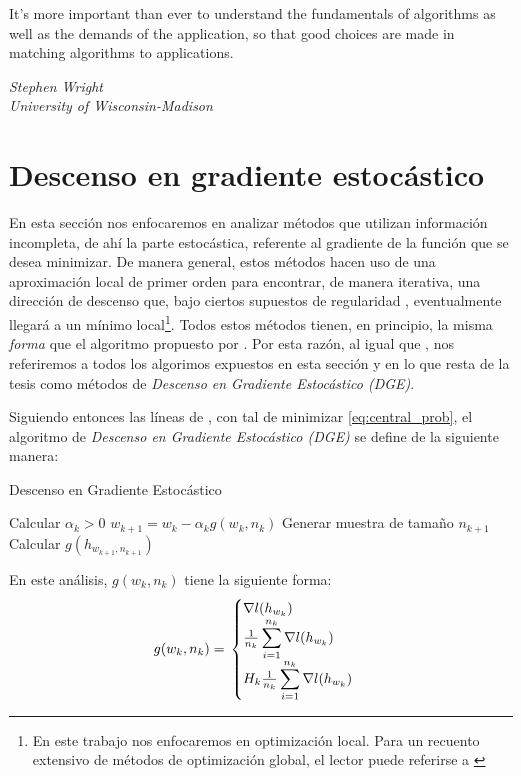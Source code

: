 \documentclass{book}
\theoremstyle{plain}
\theoremstyle{definition}
\theoremstyle{remark}
\begin{document}
\epigraph{It’s more important than ever to understand the fundamentals of
algorithms as well as the demands of the application, so that good
choices are made in matching algorithms to applications.}{\textit{Stephen Wright \\ University of Wisconsin-Madison}}
\newpage

\section{Descenso en gradiente estocástico}

En esta sección nos enfocaremos en analizar métodos que utilizan información incompleta, de ahí la parte estocástica, referente al gradiente de la función que se desea minimizar. De manera general, estos métodos hacen uso de una aproximación local de primer orden para encontrar, de manera iterativa, una dirección de descenso que, bajo ciertos supuestos de regularidad \cite{NOCEDAL}, eventualmente llegará a un mínimo local\footnote{En este trabajo nos enfocaremos en optimización local. Para un recuento extensivo de métodos de optimización global, el lector puede referirse a \cite{TORN}}. Todos estos métodos tienen, en principio, la misma \emph{forma} que el algoritmo propuesto por \cite{ROBBINS}. Por esta razón, al igual que \cite{BOTTOU}, nos referiremos a todos los algorimos expuestos en esta sección y en lo que resta de la tesis como métodos de \emph{Descenso en Gradiente Estocástico (DGE)}.

Siguiendo entonces las líneas de \cite{BOTTOU}, con tal de minimizar \ref{eq:central_prob}, el algoritmo de \emph{Descenso en Gradiente Estocástico (DGE)} se define de la siguiente manera:

 \begin{algorithm}
   \caption{Descenso en Gradiente Estocástico}
    \begin{algorithmic}[1]
        \State Calcular $\alpha_k > 0$
        \State $w_{k+1} = w_k - \alpha_kg(w_k, n_k)$
        \State Generar muestra de tamaño $n_{k+1}$
        \State Calcular $g(h_{w_{k+1}, n_{k+1}})$
        \EndWhile
       \EndFunction
\end{algorithmic}
\end{algorithm}

En este análisis, $g(w_k, n_k)$ tiene la siguiente forma:
\[
g(w_k, n_k) = \\
\begin{cases}
      \nabla l(h_{w_k}) \\
      \frac{1}{n_k}\displaystyle\sum_{i=1}^{n_k}\nabla l(h_{w_k}) \\
      H_k \frac{1}{n_k}\displaystyle\sum_{i=1}^{n_k}\nabla l(h_{w_k})
   \end{cases}
\]
\end{document}
